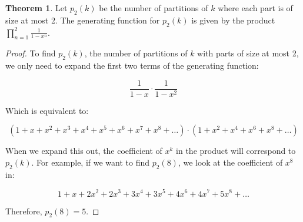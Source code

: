 \documentclass{article}
\theoremstyle{definition}
\newtheorem{theorem}{Theorem}
\begin{document}
\begin{theorem}
Let $p_2(k)$ be the number of partitions of $k$ where each part is of size at most 2. The generating function for 
$p_2(k)$ is given by the product $\prod_{n=1}^{2} \frac{1}{1-x^n}$.
\end{theorem}

\begin{proof}
To find $p_2(k)$, the number of partitions of $k$ with parts of size at most 2, we only need to expand the first two
terms of the generating function:

\[
\frac{1}{1 - x} \cdot \frac{1}{1 - x^2}
\]

\noindent
Which is equivalent to:

\[
(1 + x + x^2 + x^3 + x^4 + x^5 + x^6 + x^7 + x^8 + \dots) \cdot (1 + x^2 + x^4 + x^6 + x^8 + \dots)
\]

\noindent
When we expand this out, the coefficient of $x^k$ in the product will correspond to $p_2(k)$.
For example, if we want to find $p_2(8)$, we look at the coefficient of $x^8$ in:

\[
1 + x + 2x^2 + 2x^3 + 3x^4 + 3x^5 + 4x^6 + 4x^7 + 5x^8 + \dots
\]

\noindent
Therefore, $p_2(8) = 5$.

\end{proof}
\end{document}
